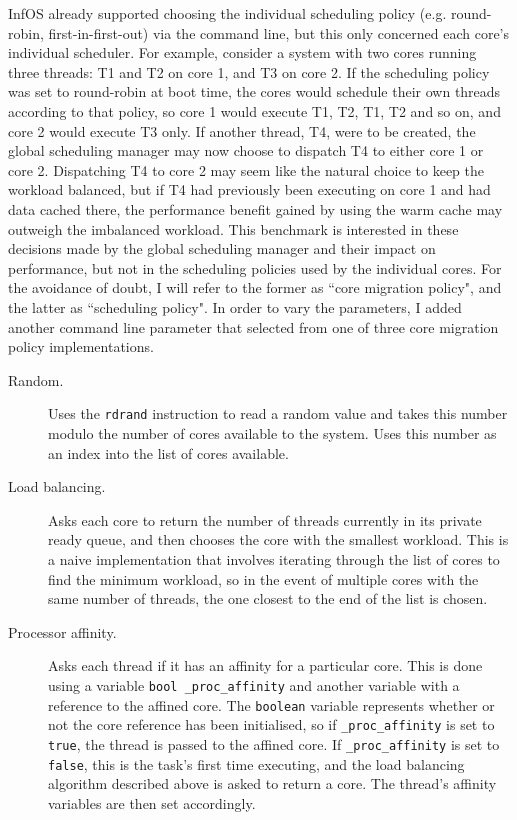 \documentclass[bsc,frontabs,singlespacing,parskip,deptreport]{infthesis}     %
\begin{document}
InfOS already supported choosing the individual scheduling policy (e.g. round-robin, first-in-first-out) via the command line, but this only concerned each core's individual scheduler. For example, consider a system with two cores running three threads: T1 and T2 on core 1, and T3 on core 2. If the scheduling policy was set to round-robin at boot time, the cores would schedule their own threads according to that policy, so core 1 would execute T1, T2, T1, T2 and so on, and core 2 would execute T3 only. If another thread, T4, were to be created, the global scheduling manager may now choose to dispatch T4 to either core 1 or core 2. Dispatching T4 to core 2 may seem like the natural choice to keep the workload balanced, but if T4 had previously been executing on core 1 and had data cached there, the performance benefit gained by using the warm cache may outweigh the imbalanced workload. This benchmark is interested in these decisions made by the global scheduling manager and their impact on performance, but not in the scheduling policies used by the individual cores. For the avoidance of doubt, I will refer to the former as ``core migration policy", and the latter as ``scheduling policy". In order to vary the parameters, I added another command line parameter that selected from one of three core migration policy implementations.

\begin{description}
\item[Random.] Uses the \verb|rdrand| instruction to read a random value and takes this number modulo the number of cores available to the system. Uses this number as an index into the list of cores available.
\item[Load balancing.] Asks each core to return the number of threads currently in its private ready queue, and then chooses the core with the smallest workload. This is a naive implementation that involves iterating through the list of cores to find the minimum workload, so in the event of multiple cores with the same number of threads, the one closest to the end of the list is chosen. 
\item[Processor affinity.] Asks each thread if it has an affinity for a particular core. This is done using a variable \verb|bool _proc_affinity| and another variable with a reference to the affined core. The \verb|boolean| variable represents whether or not the core reference has been initialised, so if \verb|_proc_affinity| is set to \verb|true|, the thread is passed to the affined core. If \verb|_proc_affinity| is set to \verb|false|, this is the task's first time executing, and the load balancing algorithm described above is asked to return a core. The thread's affinity variables are then set accordingly.
\end{description}
\end{document}
